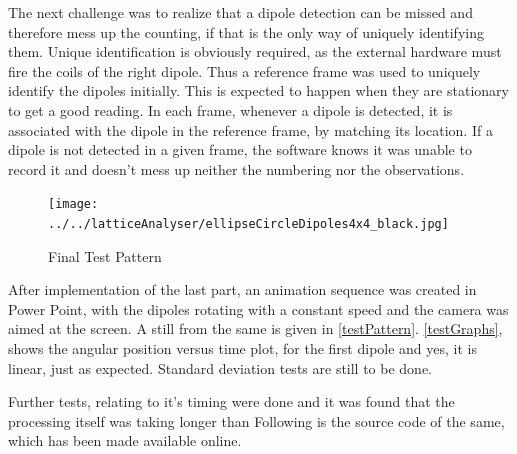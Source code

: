 		The next challenge was to realize that a dipole detection can be missed and therefore mess up the counting, if that is the only way of uniquely identifying them. Unique identification is obviously required, as the external hardware must fire the coils of the right dipole. Thus a reference frame was used to uniquely identify the dipoles initially. This is expected to happen when they are stationary to get a good reading. In each frame, whenever a dipole is detected, it is associated with the dipole in the reference frame, by matching its location. If a dipole is not detected in a given frame, the software knows it was unable to record it and doesn't mess up neither the numbering nor the observations.
		\par

		\begin{figure}[bth]
			\begin{center}
				\texttt{[image: ../../latticeAnalyser/ellipseCircleDipoles4x4\_black.jpg]}
			\end{center}
		\caption[Final Test Pattern]{Final Test Pattern}
		\label{testPattern}
		\end{figure}

		After implementation of the last part, an animation sequence was created in Power Point, with the dipoles rotating with a constant speed and the camera was aimed at the screen. A still from the same is given in \autoref{testPattern}. \autoref{testGraphs}, shows the angular position versus time plot, for the first dipole and yes, it is linear, just as expected. Standard deviation tests are still to be done.
		\par
		Further tests, relating to it's timing were done and it was found that the processing itself was taking longer than 
		Following is the source code of the same, which has been made available online.
		
		
